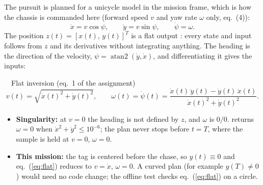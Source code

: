 
The pursuit is planned for a unicycle model in the mission frame, which is how the chassis is commanded here
(forward speed $v$ and yaw rate $\omega$ only, eq.~(4)):
\begin{equation}
\dot x=v\cos\psi,\qquad \dot y=v\sin\psi,\qquad \dot\psi=\omega .
\end{equation}
The position $z(t)=[x(t),\,y(t)]^T$ is a flat output \cite{fliess,murray,lectures}: every state and input follows from $z$ and its derivatives
without integrating anything. The heading is the direction of the velocity, $\psi=\operatorname{atan2}(\dot y,\dot x)$,
and differentiating it gives the inputs:

\begin{keybox}{\faCalculator\ \ Flat inversion (eq.~1 of the assignment)}
\begin{equation}
v(t)=\sqrt{\dot x(t)^2+\dot y(t)^2},\qquad
\omega(t)=\dot\psi(t)=\frac{\dot x(t)\,\ddot y(t)-\dot y(t)\,\ddot x(t)}{\dot x(t)^2+\dot y(t)^2}.
\label{eq:flat}
\end{equation}
\end{keybox}
\begin{itemize}
  \item \textbf{Singularity:} at $v=0$ the heading is not defined by $z$, and $\omega$ is $0/0$. 
        returns $\omega=0$ when $\dot x^2+\dot y^2\le10^{-6}$; the plan never stops before $t=T$, where the sample is
        held at $v=0$, $\omega=0$.
  \item \textbf{This mission:} the tag is centered before the chase, so $y(t)\equiv0$ and eq.~(\ref{eq:flat}) reduces to
        $v=\dot x$, $\omega=0$. A curved plan (for example $y(T)\neq0$) would need no code change; the offline test
         checks eq.~(\ref{eq:flat}) on a circle.
\end{itemize}

